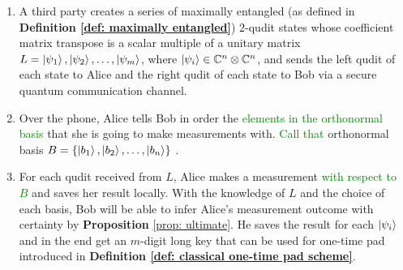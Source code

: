 \begin{enumerate}
    \item A third party creates a series of maximally entangled (as defined in \textbf{Definition \ref{def: maximally entangled}}) $2$-qudit states whose coefficient matrix transpose is a scalar multiple of a unitary matrix $L={\ket{\psi_1}, \ket{\psi_2}, \hdots, \ket{\psi_m}}$, where $\ket{\psi_i} \in \mathbb{C}^n \otimes \mathbb{C}^n$, and sends the left qudit of each state to Alice and the right qudit of each state to Bob via a secure quantum communication channel.
    \item Over the phone, Alice tells Bob in order the \textcolor{green}{elements in the orthonormal basis} that she is going to make measurements with. \textcolor{green}{Call that} orthonormal basis $B=\{\ket{b_1}, \ket{b_2}, \hdots, \ket{b_n}\}$ .
    \item For each qudit received from $L$, Alice makes a measurement \textcolor{green}{with respect to $B$} and saves her result locally. With the knowledge of $L$ and the choice of each basis, Bob will be able to infer Alice's measurement outcome with certainty by {\bf{Proposition}} \ref{prop: ultimate}.  He saves the result for each $\ket{\psi_i}$ and in the end get an $m$-digit long key that can be used for one-time pad introduced in \textbf{Definition \ref{def: classical one-time pad scheme}}.
\end{enumerate}